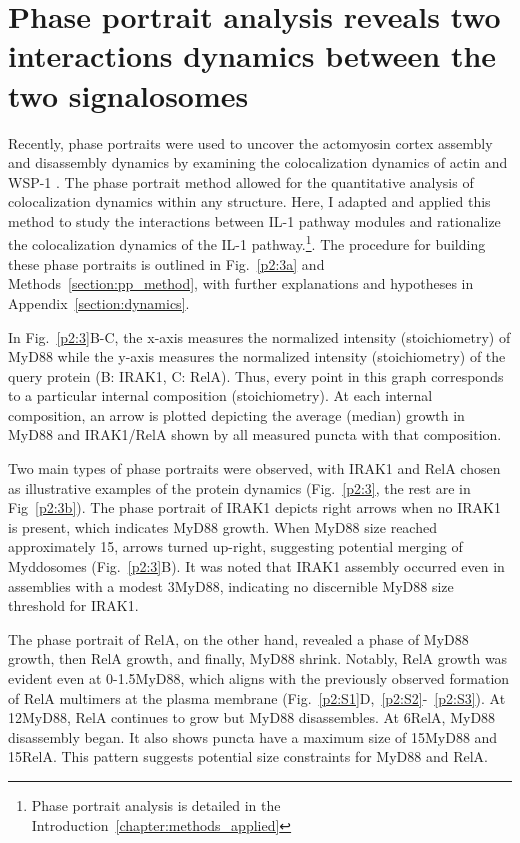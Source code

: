 \section{Phase portrait analysis reveals two interactions dynamics between the two signalosomes}
\label{section:two_dynamics}
Recently, phase portraits were used to uncover the actomyosin cortex assembly and disassembly dynamics by examining the colocalization dynamics of actin and WSP-1 \autocite{Yan_2022}. The phase portrait method allowed for the quantitative analysis of colocalization dynamics within any structure. Here, I adapted and applied this method to study the interactions between IL-1 pathway modules and rationalize the colocalization dynamics of the IL-1 pathway.\footnote{Phase portrait analysis is detailed in the Introduction~\ref{chapter:methods_applied}}. The procedure for building these phase portraits is outlined in Fig.~\ref{p2:3a} and Methods~\ref{section:pp_method}, with further explanations and hypotheses in Appendix~\ref{section:dynamics}.

In Fig.~\ref{p2:3}B-C, the x-axis measures the normalized intensity (stoichiometry) of MyD88 while the y-axis measures the normalized intensity (stoichiometry) of the query protein (B: IRAK1, C: RelA). Thus, every point in this graph corresponds to a particular internal composition (stoichiometry). At each internal composition, an arrow is plotted depicting the average (median) growth in MyD88 and IRAK1/RelA shown by all measured puncta with that composition.

Two main types of phase portraits were observed, with IRAK1 and RelA chosen as illustrative examples of the protein dynamics (Fig.~\ref{p2:3}, the rest are in Fig~\ref{p2:3b}). The phase portrait of IRAK1 depicts right arrows when no IRAK1 is present, which indicates MyD88 growth. When MyD88 size reached approximately 15\times, arrows turned up-right, suggesting potential merging of Myddosomes (Fig.~\ref{p2:3}B). It was noted that IRAK1 assembly occurred even in assemblies with a modest 3\times MyD88, indicating no discernible MyD88 size threshold for IRAK1.

The phase portrait of RelA, on the other hand, revealed a phase of MyD88 growth, then RelA growth, and finally, MyD88 shrink. Notably, RelA growth was evident even at 0-1.5\times MyD88, which aligns with the previously observed formation of RelA multimers at the plasma membrane (Fig.~\ref{p2:S1}D,~\ref{p2:S2}-~\ref{p2:S3}). At 12\times MyD88, RelA continues to grow but MyD88 disassembles. At 6\times RelA, MyD88 disassembly began. It also shows puncta have a maximum size of 15\times MyD88 and 15\times RelA. This pattern suggests potential size constraints for MyD88 and RelA.

